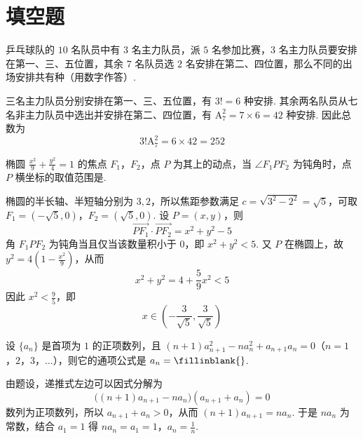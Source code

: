 \section{填空题}

\begin{problem}
乒乓球队的 \(10\) 名队员中有 \(3\) 名主力队员，派 \(5\) 名参加比赛，\(3\) 名主力队员要安排在第一、三、五位置，其余 \(7\) 名队员选 \(2\) 名安排在第二、四位置，那么不同的出场安排共有\fillinblank{}种（用数字作答）.


\begin{solution}
三名主力队员分别安排在第一、三、五位置，有 \(3!=6\) 种安排. 其余两名队员从七名非主力队员中选出并安排在第二、四位置，有 \(\mathrm A_7^2=7\times6=42\) 种安排. 因此总数为
\[
3!\mathrm A_7^2=6\times42=252
\]
\end{solution}
\end{problem}

\begin{problem}
椭圆 \(\frac{x^{2}}{9}+\frac{y^{2}}{4}=1\) 的焦点 \(F_{1}\)，\(F_{2}\)，点 \(P\) 为其上的动点，当 \(\angle F_{1}PF_{2}\) 为钝角时，点 \(P\) 横坐标的取值范围是\fillinblank{}.


\begin{solution}
椭圆的半长轴、半短轴分别为 \(3,2\)，所以焦距参数满足 \(c=\sqrt{3^2-2^2}=\sqrt5\)，可取 \(F_1=(-\sqrt5,0)\)，\(F_2=(\sqrt5,0)\). 设 \(P=(x,y)\)，则
\[
\overrightarrow{PF_1}\cdot\overrightarrow{PF_2}=x^2+y^2-5
\]
角 \(F_1PF_2\) 为钝角当且仅当该数量积小于 \(0\)，即 \(x^2+y^2<5\). 又 \(P\) 在椭圆上，故 \(y^2=4(1-\frac{x^2}{9})\)，从而
\[
x^2+y^2=4+\frac59x^2<5
\]
因此 \(x^2<\frac95\)，即
\[
x\in\left(-\frac3{\sqrt5},\frac3{\sqrt5}\right)
\]
\end{solution}
\end{problem}

\begin{problem}
设 \(\{a_{n}\}\) 是首项为 \(1\) 的正项数列，且 \((n+1)a_{n+1}^{2}-na_{n}^{2}+a_{n+1}a_{n}=0\)（\(n=1\)，\(2\)，\(3\)，\(\dots\)），则它的通项公式是 \(a_{n}=\fillinblank{}\).


\begin{solution}
由题设，递推式左边可以因式分解为
\[
\bigl((n+1)a_{n+1}-na_n\bigr)(a_{n+1}+a_n)=0
\]
数列为正项数列，所以 \(a_{n+1}+a_n>0\)，从而 \((n+1)a_{n+1}=na_n\). 于是 \(na_n\) 为常数，结合 \(a_1=1\) 得
\(na_n=a_1=1\)，\(a_n=\frac1n\).
\end{solution}
\end{problem}

